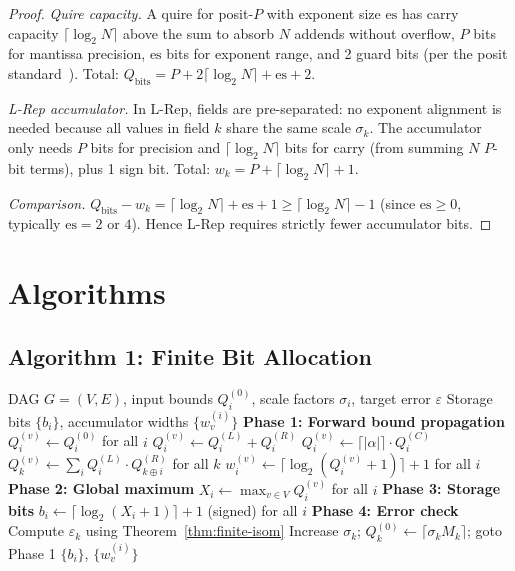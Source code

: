 \documentclass[11pt,a4paper]{article}
\theoremstyle{definition}
\theoremstyle{plain}
\theoremstyle{remark}
\begin{document}
\begin{proof}
\textit{Quire capacity.}  A quire for posit-$P$ with exponent size $\mathrm{es}$ has carry capacity $\lceil\log_2 N\rceil$ above the sum to absorb $N$ addends without overflow, $P$ bits for mantissa precision, $\mathrm{es}$ bits for exponent range, and 2 guard bits (per the posit standard~\cite{gustafson2017}).  Total: $Q_\mathrm{bits} = P + 2\lceil\log_2 N\rceil + \mathrm{es} + 2$.

\textit{L-Rep accumulator.}  In L-Rep, fields are pre-separated: no exponent alignment is needed because all values in field $k$ share the same scale $\sigma_k$.  The accumulator only needs $P$ bits for precision and $\lceil\log_2 N\rceil$ bits for carry (from summing $N$ $P$-bit terms), plus 1 sign bit.  Total: $w_k = P + \lceil\log_2 N\rceil + 1$.

\textit{Comparison.}  $Q_\mathrm{bits} - w_k = \lceil\log_2 N\rceil + \mathrm{es} + 1 \ge \lceil\log_2 N\rceil - 1$ (since $\mathrm{es} \ge 0$, typically $\mathrm{es} = 2$ or $4$).  Hence L-Rep requires strictly fewer accumulator bits.
\end{proof}

\section{Algorithms}
\label{sec:algo}

\subsection{Algorithm 1: Finite Bit Allocation}

\begin{algorithm}[H]
\caption{Optimal Bit Allocation for L-Rep}
\label{alg:bitalloc}
\begin{algorithmic}[1]
\REQUIRE DAG $G=(V,E)$, input bounds $Q_i^{(0)}$, scale factors $\sigma_i$, target error $\varepsilon$
\ENSURE Storage bits $\{b_i\}$, accumulator widths $\{w_v^{(i)}\}$
\STATE \textbf{Phase 1: Forward bound propagation}
   $Q_i^{(v)} \leftarrow Q_i^{(0)}$ for all $i$
   $Q_i^{(v)} \leftarrow Q_i^{(L)} + Q_i^{(R)}$
   $Q_i^{(v)} \leftarrow \lceil|\alpha|\rceil\cdot Q_i^{(C)}$
   $Q_k^{(v)} \leftarrow \sum_i Q_i^{(L)} \cdot Q_{k\oplus i}^{(R)}$ for all $k$
  \ENDIF
  \STATE $w_i^{(v)} \leftarrow \lceil\log_2(Q_i^{(v)}+1)\rceil + 1$ for all $i$
\ENDFOR
\STATE \textbf{Phase 2: Global maximum}
\STATE $X_i \leftarrow \max_{v\in V} Q_i^{(v)}$ for all $i$
\STATE \textbf{Phase 3: Storage bits}
\STATE $b_i \leftarrow \lceil\log_2(X_i+1)\rceil + 1$ (signed) for all $i$
\STATE \textbf{Phase 4: Error check}
\STATE Compute $\varepsilon_k$ using Theorem~\ref{thm:finite-isom}
  \STATE Increase $\sigma_k$; $Q_k^{(0)} \leftarrow \lceil\sigma_k M_k\rceil$; goto Phase 1
\ENDIF
\RETURN $\{b_i\}$, $\{w_v^{(i)}\}$
\end{algorithmic}
\end{algorithm}
\end{document}
